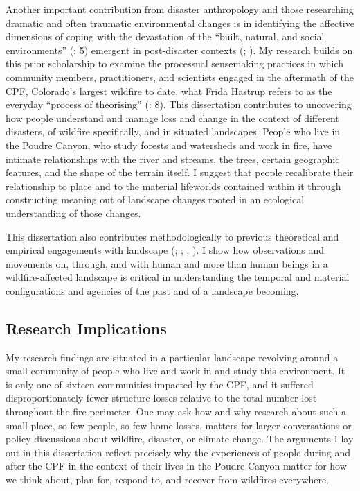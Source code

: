 \documentclass[
]{article}
\begin{document}
Another important contribution from disaster anthropology and those researching dramatic and often traumatic environmental changes is in identifying the affective dimensions of coping with the devastation of the ``built, natural, and social environments'' (: 5) emergent in post-disaster contexts (; ). My research builds on this prior scholarship to examine the processual sensemaking practices in which community members, practitioners, and scientists engaged in the aftermath of the CPF, Colorado's largest wildfire to date, what Frida Hastrup refers to as the everyday ``process of theorising'' (: 8). This dissertation contributes to uncovering how people understand and manage loss and change in the context of different disasters, of wildfire specifically, and in situated landscapes. People who live in the Poudre Canyon, who study forests and watersheds and work in fire, have intimate relationships with the river and streams, the trees, certain geographic features, and the shape of the terrain itself. I suggest that people recalibrate their relationship to place and to the material lifeworlds contained within it through constructing meaning out of landscape changes rooted in an ecological understanding of those changes.

This dissertation also contributes methodologically to previous theoretical and empirical engagements with landscape (; ; ; ). I show how observations and movements on, through, and with human and more than human beings in a wildfire-affected landscape is critical in understanding the temporal and material configurations and agencies of the past and of a landscape becoming.

\subsection{Research Implications}\label{research-implications}

My research findings are situated in a particular landscape revolving around a small community of people who live and work in and study this environment. It is only one of sixteen communities impacted by the CPF, and it suffered disproportionately fewer structure losses relative to the total number lost throughout the fire perimeter. One may ask how and why research about such a small place, so few people, so few home losses, matters for larger conversations or policy discussions about wildfire, disaster, or climate change. The arguments I lay out in this dissertation reflect precisely why the experiences of people during and after the CPF in the context of their lives in the Poudre Canyon matter for how we think about, plan for, respond to, and recover from wildfires everywhere.
\end{document}
